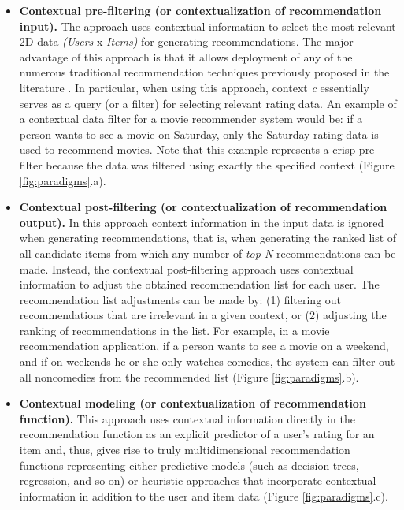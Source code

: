 \begin{itemize}
\item \textbf{Contextual pre-filtering (or contextualization of
recommendation input).} The approach uses contextual information to
select the most relevant 2D data \textit{(Users} x \textit{Items)} for generating
recommendations. The major advantage of this approach is that it
allows deployment of any of the numerous traditional recommendation
techniques previously proposed in the 
literature  \cite{adomavicius2005toward}.
In particular, when using this approach, context \textit{c} essentially 
serves as a query (or a filter) for selecting relevant rating data. 
An example of a contextual data filter for a
movie recommender system would be: if a person wants to see a movie on
Saturday, only the Saturday rating data is used to recommend movies.
Note that this example represents a crisp pre-filter because the data
was filtered using exactly the specified context (Figure \ref{fig:paradigms}.a).
\item \textbf{Contextual post-filtering (or contextualization of
recommendation output).} In this approach context information
in the input data is ignored when generating recommendations, that is, when
generating the ranked list of all candidate items from which any
number of \textit{top-N} recommendations can be made. Instead,  the
contextual post-filtering approach uses contextual information to
adjust the obtained recommendation list for each user. The
recommendation list adjustments can be made by: (1) filtering out
recommendations that are irrelevant in a given context, or (2)
adjusting the ranking of recommendations in the list. For example, in
a movie recommendation application, if a person wants to see a movie
on a weekend, and if on weekends he or she only watches comedies, the
system can filter out all noncomedies from the recommended list
(Figure  \ref{fig:paradigms}.b).
\item \textbf{Contextual modeling (or contextualization of
recommendation function).} This approach uses contextual information
directly in the recommendation function as an explicit predictor of a
user's rating for an item and, thus, gives rise to truly
multidimensional recommendation functions representing either
predictive models (such as decision trees, regression, and so on) or
heuristic approaches that incorporate contextual information in
addition to the user and item data (Figure  \ref{fig:paradigms}.c).
\end{itemize}
